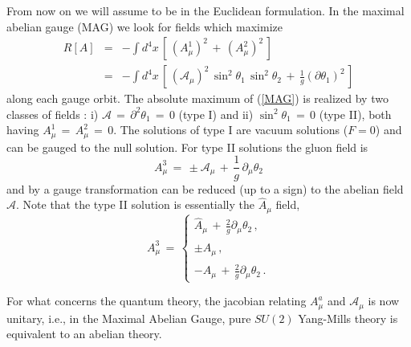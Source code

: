 \documentclass[a4paper,a4paper]{article}
\begin{document}
From now on we will assume to be in the Euclidean formulation.
In the maximal abelian gauge (MAG) we look for fields which maximize
\begin{eqnarray}
  R[A] & = &  - \int d^4x \, \left[  \, \left( A^1_\mu \right)^2 \, + \,
                              \left( A^2_\mu \right)^2 \, \right] 
  \nonumber \\
       & = &
         - \int d^4x  \, \left[  \, \left( \mathcal{A}_\mu \right)^2 \,  
                                   \sin^2 \theta_1  \, \sin^2 \theta_2 
       \, + \,
                              \frac{1}{g} \left( \partial \theta_1 \right)^2
                         \, \right]
  \label{MAG}
\end{eqnarray}
along each gauge orbit. The absolute maximum of (\ref{MAG}) is realized by
two classes of fields :
i) $\mathcal{A} \, = \, \partial^2 \theta_1 \, = \, 0$ (type I) and
ii) $\sin^2 \theta_1 \, = \, 0$ (type II), both having 
$A^1_\mu \, = \, A^2_\mu \, = \, 0$. The solutions of type I are 
vacuum solutions ($F = 0$) and can be gauged to the null solution. 
For type II solutions the gluon field is
\begin{equation}
 A^3_\mu \, = \, \pm \mathcal{A}_\mu \, + \, \frac{1}{g} \, 
       \partial_\mu \theta_2
\end{equation}
and by a gauge transformation \cite{Ga} can be reduced (up to a sign) to the 
abelian field $\mathcal{A}$. Note that the type II solution is essentially
the $\hat{A}_\mu$ field,
\begin{equation}
 A^3_\mu \, = \,  \left\{
       \begin{array}{l}
         \hat{A}_\mu \, + \, \frac{2}{g} \partial_\mu \theta_2 \, , \\
          \pm \hat{A}_\mu \, , \\
          -\hat{A}_\mu \, + \, \frac{2}{g} \partial_\mu \theta_2 \, .
       \end{array}
                 \right.
\end{equation}

For what concerns the quantum theory, the jacobian relating $A^a_\mu$ and 
$\mathcal{A}_\mu$ is now unitary, 
i.e., in the Maximal Abelian Gauge, pure $SU(2)$ 
Yang-Mills theory is equivalent to an abelian theory. 
\end{document}
